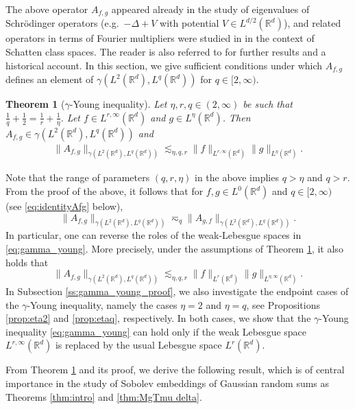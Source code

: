 \documentclass[reqno]{amsart}
\theoremstyle{plain}
\newtheorem{theorem}{Theorem}[section]
\theoremstyle{remark}
\theoremstyle{plain}
\numberwithin{equation}{section}
\def\R{{\mathbb R}}
\newcommand{\g}{\gamma}
\newcommand{\1}{\one}
\begin{document}
The above operator $A_{f,g}$ appeared already in the study of eigenvalues of Schr\"odinger operators (e.g.\ $-\Delta+V$ with potential $V\in L^{d/2}(\R^d)$), and related operators in terms of Fourier multipliers were studied in \cite{Cwikel,Simon76, Simon05} in the context of Schatten class spaces. The reader is also referred to  \cite{LevSuZan} for further results and a historical account.
In this section, we give sufficient conditions under which $A_{f,g}$ defines an element of $\gamma(L^2(\R^d), L^q(\R^d))$ for $q\in [2, \infty)$. 

\begin{theorem}[$\gamma$-Young inequality]\label{t:gammaYoung}
Let $\eta,r,q\in (2, \infty)$ be such that $\frac{1}{q} + \frac{1}{2} = \frac{1}{r} + \frac{1}{\eta}$. Let $f\in L^{r,\infty}(\R^d)$ and $g\in L^{\eta}(\R^d)$. Then 
$
 A_{f,g}\in \gamma(L^2(\R^d),L^q(\R^d))
$
and 
\begin{align}
\label{eq:gamma_young}
\|A_{f,g}\|_{\gamma(L^2(\R^d),L^q(\R^d))} \lesssim_{\eta,q,r} \|f\|_{L^{r,\infty}(\R^d)} \|g\|_{L^{\eta}(\R^d)}. 
\end{align}
\end{theorem}


Note that the range of parameters $(q,r,\eta)$ in the above implies $q>\eta$ and $q>r$.
%
From the proof of the above, it follows that for $f,g\in L^0(\R^d)$ and $q\in [2,\infty)$ (see \eqref{eq:identityAfg} below),
\begin{equation}
\label{eq:gamma_estimate_for_A_is_symmetric}
\|A_{f,g}\|_{\g(L^2(\R^d),L^q(\R^d))}\eqsim_q \|A_{g,f}\|_{\g(L^2(\R^d),L^q(\R^d))}.
\end{equation}
In particular, one can reverse the roles of the weak-Lebesgue spaces in \eqref{eq:gamma_young}. More precisely, under the assumptions of Theorem \ref{t:gammaYoung}, it also holds that 
$$
\|A_{f,g}\|_{\gamma(L^2(\R^d),L^q(\R^d))} 
\lesssim_{\eta,q,r} \|f\|_{L^{r}(\R^d)} \|g\|_{L^{\eta,\infty}(\R^d)}.
$$
In Subsection \ref{ss:gamma_young_proof}, we also investigate the endpoint cases of the $\gamma$-Young inequality, namely the cases $\eta=2$ and $\eta=q$, see Propositions \ref{prop:eta2} and \ref{prop:etaq}, respectively. In both cases, we show that the $\gamma$-Young inequality \eqref{eq:gamma_young} can hold only if the weak Lebesgue space $L^{r,\infty}(\R^d)$ is replaced by the usual Lebesgue space $L^r(\R^d)$.

\smallskip

From Theorem \ref{t:gammaYoung} and its proof, we derive the following result, which is of central importance in the study of Sobolev embeddings of Gaussian random sums as Theorems \ref{thm:intro} and \ref{thm:MgTmu delta}. 
\end{document}
